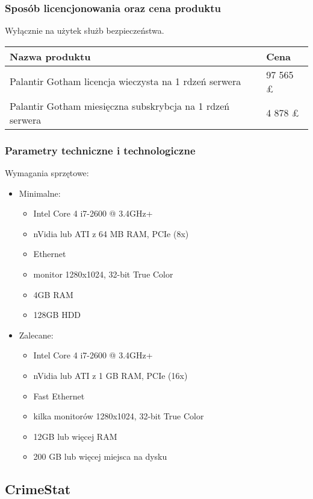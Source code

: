 \documentclass[11pt,a4paper]{article}
\begin{document}
\subsubsection*{Sposób licencjonowania oraz cena produktu}

Wyłącznie na użytek służb bezpieczeństwa.

	\begin{tabular}{ | p{6cm}| p{6cm} | }
    	\hline
    	\textbf{Nazwa produktu} & \textbf{Cena}\\ \hline
	Palantir Gotham licencja wieczysta na 1 rdzeń serwera &   97 565 \pounds \\ \hline
    	Palantir Gotham miesięczna subskrybcja na 1 rdzeń serwera &  4 878 \pounds \\ \hline
  	\end{tabular}

\subsubsection*{Parametry techniczne i technologiczne}

Wymagania sprzętowe:
\begin{itemize}
	\item Minimalne:
		\begin{itemize}
		\item Intel Core 4 i7-2600 @ 3.4GHz+
    		\item nVidia lub ATI z 64 MB RAM, PCIe (8x)
		\item Ethernet
		\item monitor 1280x1024, 32-bit True Color
		\item 4GB RAM 
		\item 128GB HDD 
		\end{itemize}
	\item Zalecane: 
		\begin{itemize}
		\item Intel Core 4 i7-2600 @ 3.4GHz+
    		\item nVidia lub ATI z 1 GB RAM, PCIe (16x)
		\item Fast Ethernet
		\item kilka monitorów 1280x1024, 32-bit True Color
		\item 12GB lub więcej RAM 
		\item 200 GB lub więcej miejsca na dysku
		\end{itemize}
\end{itemize}


\subsection{CrimeStat}
\end{document}
